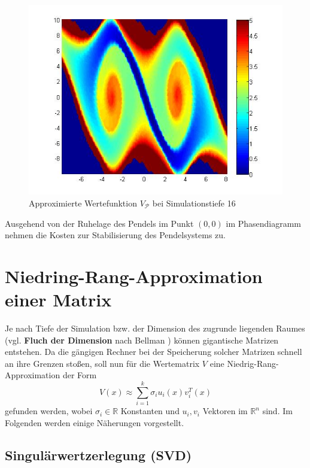 \documentclass[12pt,a4paper,twoside]{article}
\begin{document}
	\begin{figure}[h]
		\center
		\includegraphics[scale=0.55]{valuefunction_plot_256.jpg}
		\caption{Approximierte Wertefunktion $V_\mathcal{P}$ bei Simulationstiefe 16}
	\end{figure}
	\newpage
	Ausgehend von der Ruhelage des Pendels im Punkt $(0,0)$ im Phasendiagramm nehmen die Kosten zur Stabilisierung 
	des Pendelsystems zu.
\section{Niedring-Rang-Approximation einer Matrix}
	Je nach Tiefe der Simulation bzw. der Dimension des zugrunde liegenden Raumes (vgl. \textbf{Fluch der Dimension} 
	nach Bellman \citep{Bellman1961}) können gigantische Matrizen entstehen. Da die gängigen Rechner bei der 
	Speicherung solcher Matrizen schnell an ihre Grenzen stoßen, soll nun für die Wertematrix $V$ eine Niedrig-Rang-
	Approximation der Form
	\begin{equation}
		\label{eq:approx}
		V(x)\approx \sum_{i=1}^k\sigma_i u_i(x) v_i^T(x)
	\end{equation}
	gefunden werden, wobei $\sigma_i\in \mathds{R}$ Konstanten und $u_i, v_i$ Vektoren im $\mathds{R}^n$ sind. Im Folgenden werden einige Näherungen vorgestellt.
	\subsection{Singulärwertzerlegung (SVD)}
\end{document}
